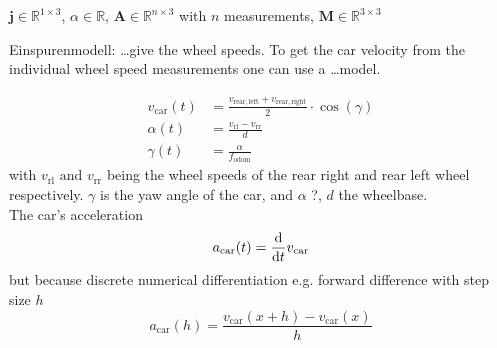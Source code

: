 $\mathbf{j} \in \mathbb{R}^{1\times3}$, $\alpha \in \mathbb{R}$, $\mathbf{A} \in \mathbb{R}^{n\times3}$ with $n$ measurements, $\mathbf{M} \in \mathbb{R}^{3\times3}$


Einspurenmodell:
\dots give the wheel speeds. To get the car velocity from the individual wheel speed measurements one can use a \dots model.

\begin{align}
    v_\mathrm{car}(t) &= \frac{v_\mathrm{rear,left} + v_\mathrm{rear,right}}{2}\cdot\cos(\gamma) \\
    \alpha(t) &= \frac{v_\mathrm{rl} - v_\mathrm{rr}}{d} \\
    \gamma(t) &= \frac{\alpha}{f_\mathrm{odom}}
\end{align}
with $v_\mathrm{rl} \text{ and } v_\mathrm{rr}$ being the wheel speeds of the rear right and rear left wheel respectively. $\gamma$ is the yaw angle of the car, and $\alpha$ ?, $d$ the wheelbase.\\
The car's acceleration
\begin{equation}
    a_\mathrm{car}(t) = \dv{t}v_\mathrm{car}
\end{equation}
but because discrete numerical differentiation e.g. forward difference with step size $h$
\begin{equation}
    a_\mathrm{car}(h) = \frac{v_\mathrm{car}(x + h) - v_\mathrm{car}(x)}{h}
\end{equation}

